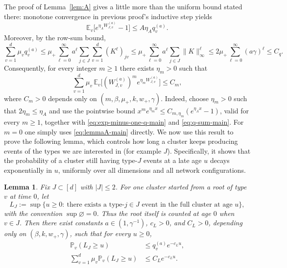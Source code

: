 \documentclass{article}
\newtheorem{lemma}{Lemma}[section]
\newcommand{\Pbb}{\mathbb{P}}
\newcommand{\E}{\mathbb{E}}
\begin{document}
The proof of Lemma~\ref{lem:A} gives a little more than the uniform bound stated there: monotone convergence in previous proof's inductive step yields
\begin{equation}
\label{eq:exp-minus-one-q-main}
\E_v\big[e^{\eta_A W_{J,v}^{(a)}}-1\big]\le A\eta_A q_v^{(a)}.
\end{equation}
Moreover, by the row-sum bound,
\begin{equation}
\label{eq:q-sum-main}
\sum_{v=1}^d \mu_v q_v^{(a)}
\le \mu_+\sum_{\ell=0}^{\infty} a^{\ell}\sum_{j\in J}\sum_{v=1}^d (K^{\ell})_{jv} \le  \mu_+\sum_{\ell=0}^{\infty} a^{\ell}\sum_{j\in J}\|K\|_{\infty}^\ell\le 2\mu_+\sum_{\ell=0}^{\infty}(a\gamma)^{\ell}
\le C_q.
\end{equation}
Consequently, for every integer $m\ge 1$ there exists $\eta_m>0$ such that
\begin{equation}
\label{eq:agg-W-moment-main}
\sum_{v=1}^d \mu_v\,\E_v\big[(W_{J,v}^{(a)})^m e^{\eta_m W_{J,v}^{(a)}}\big]\le C_m,
\end{equation}
where $C_m>0$ depends only on $(m,\beta,\mu_+,k,w_+,\gamma)$.
Indeed, choose $\eta_m>0$ such that $2\eta_m\le \eta_A$ and use the pointwise bound $x^m e^{\eta_m x}\le C_{m,\eta_m}(e^{\eta_A x}-1)$, valid for every $m\ge 1$, together with \eqref{eq:exp-minus-one-q-main} and \eqref{eq:q-sum-main}. For $m=0$ one simply uses \eqref{eq:lemmaA-main} directly. We now use this result to prove the following lemma, which controls how long a cluster keeps producing events of the types we are interested in (for example $J$). Specifically, it shows that the probability of a cluster still having type-$J$ events at a late age $u$ decays exponentially in $u$, uniformly over all dimensions and all network configurations.
\begin{lemma}
\label{lem:relevant-lifetime-tail}
Fix $J\subset[d]$ with $|J|\le 2$. For one cluster started from a root of type $v$ at time $0$, let
\[
L_J:=\sup\{u\ge 0:\ \text{there exists a type-}j\in J\text{ event in the full cluster at age }u\},
\]
with the convention $\sup\varnothing=0$. Thus the root itself is counted at age $0$ when $v\in J$. Then there exist constants $a\in(1,\gamma^{-1})$, $c_L>0$, and $C_L>0$, depending only on $(\beta,k,w_+,\gamma)$, such that for every $u\ge 0$,
\begin{align}
\Pbb_v(L_J\ge u)&\le q_v^{(a)} e^{-c_L u}, \label{eq:lifetime-tail-pointwise-main}\\
\sum_{v=1}^d \mu_v\Pbb_v(L_J\ge u)&\le C_L e^{-c_L u}. \label{eq:lifetime-tail-agg-main}
\end{align}
\end{lemma}
\end{document}
